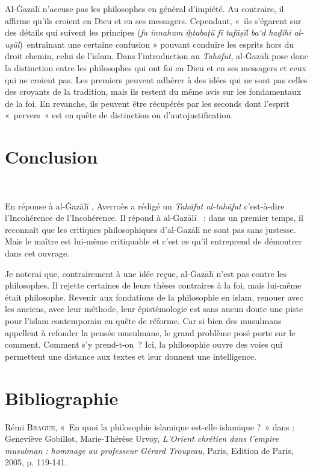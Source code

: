 Al-Ġazālī \label{theol:AlGazali7}  n'accuse pas les philosophes en général d'impiété. Au
contraire, il affirme qu'ils croient en Dieu et en ses messagers.
Cependant, «~ils s'égarent sur des détails qui suivent les principes
(\emph{fa innahum} \emph{iḫtabaṭū fī tafāṣīl ba`d haḏihi
al-uṣūl})~entraînant une certaine confusion » pouvant conduire les esprits hors du droit chemin, celui de
l'islam. Dans l'introduction au \emph{Tahāfut}, al-Ġazālī pose donc la
distinction entre les philosophes qui ont foi en Dieu et en ses
messagers et ceux qui ne croient pas. Les premiers peuvent adhérer à des
idées qui ne sont pas celles des croyants de la tradition, mais ils
restent du même avis sur les fondamentaux de la foi. En revanche, ils
peuvent être récupérés par les seconds dont l'esprit «~pervers~» est en
quête de distinction ou d'autojustification.


\section{Conclusion}\

En réponse à al-Ġazālī \label{theol:AlGazali8}, Averroès a rédigé un \emph{Tahāfut al-tahāfut}
c'est-à-dire l'Incohérence de l'Incohérence. Il répond à al-Ġazālī \label{theol:AlGazali25}~:
dans un premier temps, il reconnaît que les critiques philosophiques
d'al-Ġazālī ne sont pas sans justesse. Mais le maître est lui-même
critiquable et c'est ce qu'il entreprend de démontrer dans cet ouvrage.

Je noterai que, contrairement à une idée reçue, al-Ġazālī n'est pas
contre les philosophes. Il rejette certaines de leurs thèses contraires
à la foi, mais lui-même était philosophe. Revenir aux fondations de la
philosophie en islam, renouer avec les anciens, avec leur méthode, leur
épistémologie est sans aucun doute une piste pour l'islam contemporain
en quête de réforme. Car si bien des musulmans appellent à refonder la
pensée musulmane, le grand problème posé porte sur le comment. Comment
s'y prend-t-on~? Ici, la philosophie ouvre des voies qui permettent une
distance aux textes et leur donnent une intelligence.


\section{Bibliographie}


Rémi \textsc{Brague}, «~En quoi la philosophie islamique est-elle
islamique ?~» dans : Geneviève Gobillot, Marie-Thérèse Urvoy,
\emph{L'Orient chrétien dans l'empire musulman : hommage au professeur
Gérard Troupeau}, Paris, Edition de Paris, 2005, p. 119-141.

